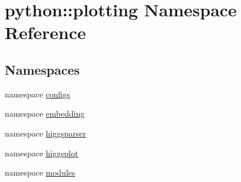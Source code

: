 \hypertarget{namespacepython_1_1plotting}{
\section{python::plotting Namespace Reference}
\label{namespacepython_1_1plotting}
}
\subsection*{Namespaces}
\begin{DoxyCompactItemize}
\item 
namespace \hyperlink{namespacepython_1_1plotting_1_1configs}{configs}
\item 
namespace \hyperlink{namespacepython_1_1plotting_1_1embedding}{embedding}
\item 
namespace \hyperlink{namespacepython_1_1plotting_1_1higgsparser}{higgsparser}
\item 
namespace \hyperlink{namespacepython_1_1plotting_1_1higgsplot}{higgsplot}
\item 
namespace \hyperlink{namespacepython_1_1plotting_1_1modules}{modules}
\end{DoxyCompactItemize}
